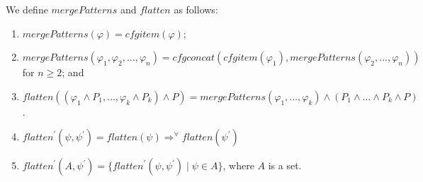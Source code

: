 \documentclass{article}
\begin{document}
\begin{definition}
We define $\mathit{mergePatterns}$ and $\mathit{flatten}$ as follows:
\begin{enumerate}
    \item $\mathit{mergePatterns}(\varphi) = \mathit{cfgitem}(\varphi)$;
    \item $\mathit{mergePatterns}(\varphi_1, \varphi_2, \ldots, \varphi_n)
        = \mathit{cfgconcat}(\mathit{cfgitem}(\varphi_1), \mathit{mergePatterns}(\varphi_2, \ldots, \varphi_n))$ for $n \geq 2$; and
    \item $\mathit{flatten}((\varphi_1 \land P_1, \ldots, \varphi_k \land P_k) \land P)
           = \mathit{mergePatterns}(\varphi_1, \ldots, \varphi_k) \land (P_1 \land \ldots \land P_k \land P)$.
    \item $\mathit{flatten}^\prime(\psi, \psi^\prime) = \mathit{flatten}(\psi) \Rightarrow^\forall \mathit{flatten}(\psi^\prime)$
    \item $\mathit{flatten}^\prime(A, \psi^\prime) = \{ \mathit{flatten}^\prime(\psi, \psi^\prime) \mid \psi \in A \}$, where $A$ is a set.
\end{enumerate}
\end{definition}
\end{document}
